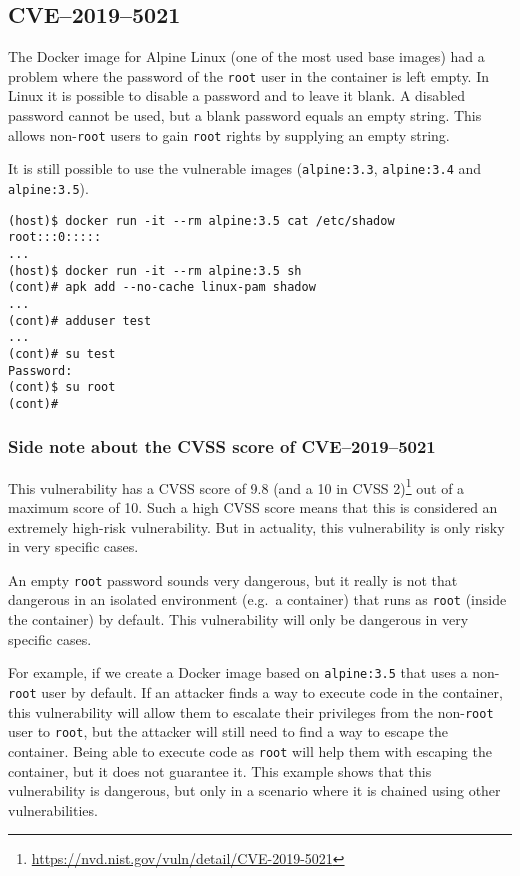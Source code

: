 \subsection{CVE--2019--5021}\label{subsection:CVE-2019-5021}
The Docker image for Alpine Linux (one of the most used base images) had a problem where the password of the \lstinline{root} user in the container is left empty. In Linux it is possible to disable a password and to leave it blank. A disabled password cannot be used, but a blank password equals an empty string. This allows non-\lstinline{root} users to gain \lstinline{root} rights by supplying an empty string.

\medskip

It is still possible to use the vulnerable images (\lstinline{alpine:3.3}, \lstinline{alpine:3.4} and \lstinline{alpine:3.5}).
\begin{lstlisting}[caption={The Docker image of Alpine Linux 3.5 has an empty password.},captionpos=b]
(host)$ docker run -it --rm alpine:3.5 cat /etc/shadow
root:::0:::::
...
(host)$ docker run -it --rm alpine:3.5 sh
(cont)# apk add --no-cache linux-pam shadow
...
(cont)# adduser test
...
(cont)# su test
Password:
(cont)$ su root
(cont)#
\end{lstlisting}

\subsubsection*{Side note about the CVSS score of CVE--2019--5021}

This vulnerability has a CVSS score of 9.8 (and a 10 in CVSS 2)\footnote{\url{https://nvd.nist.gov/vuln/detail/CVE-2019-5021}} out of a maximum score of 10. Such a high CVSS score means that this is considered an extremely high-risk vulnerability. But in actuality, this vulnerability is only risky in very specific cases.

An empty \lstinline{root} password sounds very dangerous, but it really is not that dangerous in an isolated environment (e.g.\ a container) that runs as \lstinline{root} (inside the container) by default. This vulnerability will only be dangerous in very specific cases.

For example, if we create a Docker image based on \lstinline{alpine:3.5} that uses a non-\lstinline{root} user by default. If an attacker finds a way to execute code in the container, this vulnerability will allow them to escalate their privileges from the non-\lstinline{root} user to \lstinline{root}, but the attacker will still need to find a way to escape the container. Being able to execute code as \lstinline{root} will help them with escaping the container, but it does not guarantee it. This example shows that this vulnerability is dangerous, but only in a scenario where it is chained using other vulnerabilities.
